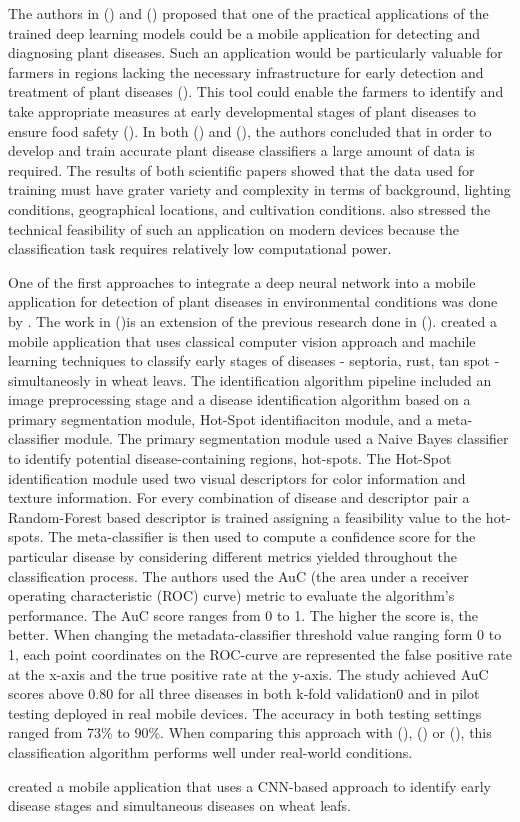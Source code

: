 \documentclass{BachelorBUI}
\begin{document}
The authors in (\cite{Mohanty:2016}) and (\cite{Ferentinos:2018}) proposed that one of the practical applications of the trained deep learning models could be a mobile application for detecting and diagnosing plant diseases. Such an application would be particularly valuable for farmers in regions lacking the necessary infrastructure for early detection and treatment of plant diseases (\cite{Ferentinos:2018}). This tool could enable the farmers to identify and take appropriate measures at early developmental stages of plant diseases to ensure food safety (\cite{Mohanty:2016}). In both (\cite{Mohanty:2016}) and (\cite{Ferentinos:2018}), the authors concluded that in order to develop and train accurate plant disease classifiers a large amount of data is required. The results of both scientific papers showed that the data used for training must have grater variety and complexity in terms of background, lighting conditions, geographical locations, and cultivation conditions. \textcite{Ferentinos:2018} also stressed the technical feasibility of such an application on modern devices because the classification task requires relatively low computational power.

One of the first approaches to integrate a deep neural network into a mobile application for detection of plant diseases in environmental conditions was done by \cite{Picon:2019}. The work in (\cite{Picon:2019})is an extension of the previous research done in (\cite{Johannes:2017}). \textcite{Johannes:2017} created a mobile application that uses classical computer vision approach and machile learning techniques to classify early stages of diseases - septoria, rust, tan spot - simultaneosly in wheat leavs. The identification algorithm pipeline included an image preprocessing stage and a disease identification algorithm based on a primary segmentation module, Hot-Spot identifiaciton module, and a meta-classifier module. The primary segmentation module used a Naive Bayes classifier to identify potential disease-containing regions, hot-spots. The Hot-Spot identification module used two visual descriptors for color information and texture information. For every combination of disease and descriptor pair a Random-Forest based descriptor is trained assigning a feasibility value to the hot-spots. The meta-classifier is then used to compute a confidence score for the particular disease by considering different metrics yielded throughout the classification process. The authors used the AuC (the area under a receiver operating characteristic (ROC) curve) metric to evaluate the algorithm's performance. The AuC score ranges from 0 to 1. The higher the score is, the better. When changing the metadata-classifier threshold value ranging form 0 to 1, each point coordinates on the ROC-curve are represented the false positive rate at the x-axis and the true positive rate at the y-axis. The study achieved AuC scores above 0.80 for all three diseases in both k-fold validation0 and in pilot testing deployed in real mobile devices. The accuracy in both testing settings ranged from 73\% to 90\%. When comparing this approach with (\cite{Sladojevic:2016}), (\cite{Mohanty:2016}) or (\cite{Ferentinos:2018}), this classification algorithm performs well under real-world conditions. 

\textcite{Picon:2019} created a mobile application that uses a CNN-based approach to identify early disease stages and simultaneous diseases on wheat leafs. 
\end{document}
